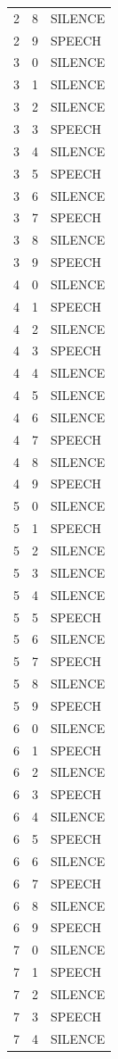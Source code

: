 \documentclass[12pt]{article} %
\begin{document}
\begin{center}
\begin{longtable}{ccl}
2&8  &SILENCE\\
2&9  &SPEECH\\
3&0  &SILENCE\\
3&1  &SILENCE\\
3&2  &SILENCE\\
3&3  &SPEECH\\
3&4  &SILENCE\\
3&5  &SPEECH\\
3&6  &SILENCE\\
3&7  &SPEECH\\
3&8  &SILENCE\\
3&9  &SPEECH\\
4&0  &SILENCE\\
4&1  &SPEECH\\
4&2  &SILENCE\\
4&3  &SPEECH\\
4&4  &SILENCE\\
4&5  &SILENCE\\
4&6  &SILENCE\\
4&7  &SPEECH\\
4&8  &SILENCE\\
4&9  &SPEECH\\
5&0  &SILENCE\\
5&1  &SPEECH\\
5&2  &SILENCE\\
5&3  &SILENCE\\
5&4  &SILENCE\\
5&5  &SPEECH\\
5&6  &SILENCE\\
5&7  &SPEECH\\
5&8  &SILENCE\\
5&9  &SPEECH\\
6&0  &SILENCE\\
6&1  &SPEECH\\
6&2  &SILENCE\\
6&3  &SPEECH\\
6&4  &SILENCE\\
6&5  &SPEECH\\
6&6  &SILENCE\\
6&7  &SPEECH\\
6&8  &SILENCE\\
6&9  &SPEECH\\
7&0  &SILENCE\\
7&1  &SPEECH\\
7&2  &SILENCE\\
7&3  &SPEECH\\
7&4  &SILENCE\\

\end{longtable}
\end{center}
\end{document}
